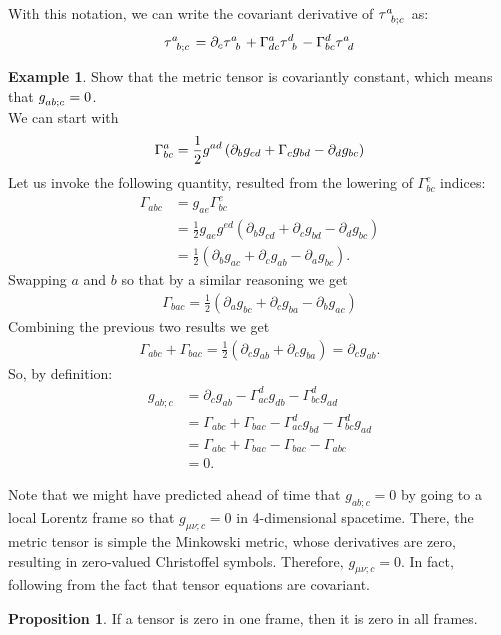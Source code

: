 \documentclass{article}
\theoremstyle{definition}
\newtheorem{prop}{Proposition}[section]
\newtheorem{exmp}{Example}[section]
\begin{document}
With this notation, we can write the covariant derivative of $\tensor{\tau}{^a_{b;c}}$ as:
\begin{align*}
\tensor{\tau}{^a_{b;c}} = \partial_c\tensor{\tau}{^a_b} + \Gamma^a_{dc}\tensor{\tau}{^d_b} - \Gamma^d_{bc}\tensor{\tau}{^a_d}
\end{align*}

\begin{exmp}
	Show that the metric tensor is covariantly constant, which means that $\tensor{g}{_{ab;c}} = 0$.\\
	
	We can start with 
	\begin{align*}
	\Gamma^a_{bc} = \frac{1}{2}\tensor{g}{^{ad}}\left(\partial_bg_{cd} + \Gamma_cg_{bd} - \partial_dg_{bc} \right) 
	\end{align*} 
	Let us invoke the following quantity, resulted from the lowering of $\Gamma^e_{bc}$ indices:
	\begin{align*}
	\Gamma_{abc} &= g_{ae}\Gamma^e_{bc}\\
	&= \frac{1}{2}g_{ae}g^{ed}\left(\partial_bg_{cd} + \partial_cg_{bd} - \partial_dg_{bc} \right) \\
	&= \frac{1}{2}\left(\partial_bg_{ac} + \partial_cg_{ab} -\partial_ag_{bc} \right).
	\end{align*}
	Swapping $a$ and $b$ so that by a similar reasoning we get
	\begin{align*}
	\Gamma_{bac} = \frac{1}{2}\left( \partial_ag_{bc} + \partial_cg_{ba} - \partial_bg_{ac} \right) 
	\end{align*}
	Combining the previous two results we get
	\begin{align*}
	\Gamma_{abc} + \Gamma_{bac} = \frac{1}{2}\left( \partial_cg_{ab} + \partial_cg_{ba}\right) = \partial_cg_{ab}. 
	\end{align*}
	So, by definition:
	\begin{align*}
	g_{ab;c} &= \partial_cg_{ab} - \Gamma^d_{ac}g_{db} - \Gamma^d_{bc}g_{ad}\\
	&= \Gamma_{abc} + \Gamma_{bac} - \Gamma^d_{ac}g_{bd} - \Gamma^d_{bc}g_{ad}\\
	&= \Gamma_{abc} + \Gamma_{bac} - \Gamma_{bac} - \Gamma_{abc}\\
	&= 0.
	\end{align*}
\end{exmp}
Note that we might have predicted ahead of time that $g_{ab;c} = 0$ by going to a local Lorentz frame so that $g_{\mu\nu;c} = 0$ in 4-dimensional spacetime. There, the metric tensor is simple the Minkowski metric, whose derivatives are zero, resulting in zero-valued Christoffel symbols. Therefore, $g_{\mu\nu;c} = 0$. In fact, following from the fact that tensor equations are covariant. 
\begin{prop}
	If a tensor is zero in one frame, then it is zero in all frames. 
\end{prop}
\end{document}
